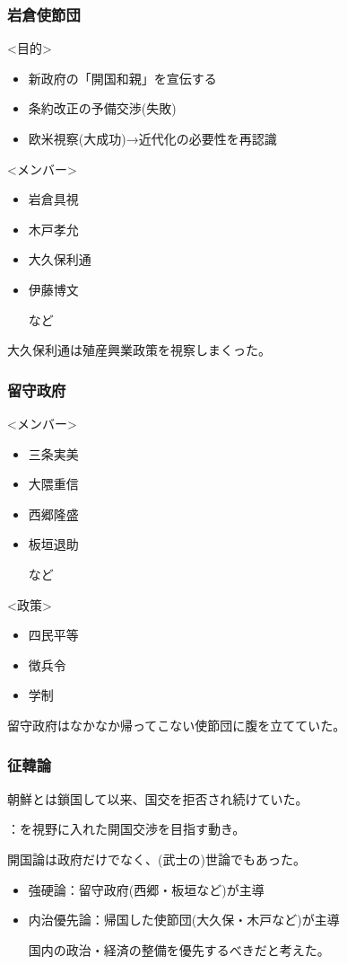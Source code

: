 \documentclass[12pt]{ltjsarticle}
\begin{document}
\subsubsection{岩倉使節団}
<目的>
\begin{itemize}
\item 新政府の「開国和親」を宣伝する
\item 条約改正の予備交渉(失敗)
\item 欧米視察(大成功)→近代化の必要性を再認識
\end{itemize}
<メンバー>
\begin{itemize}
\item 岩倉具視
\item 木戸孝允
\item 大久保利通
\item 伊藤博文

など
\end{itemize}
大久保利通は殖産興業政策を視察しまくった。

\subsubsection{留守政府}
<メンバー>
\begin{itemize}
\item 三条実美
\item 大隈重信
\item 西郷隆盛
\item 板垣退助

など
\end{itemize}
<政策>
\begin{itemize}
\item 四民平等
\item 徴兵令
\item 学制
\end{itemize}
留守政府はなかなか帰ってこない使節団に腹を立てていた。

\subsubsection{征韓論}
朝鮮とは鎖国して以来、国交を拒否され続けていた。

：を視野に入れた開国交渉を目指す動き。

開国論は政府だけでなく、(武士の)世論でもあった。

\begin{itemize}
\item 強硬論：留守政府(西郷・板垣など)が主導
\item 内治優先論：帰国した使節団(大久保・木戸など)が主導

国内の政治・経済の整備を優先するべきだと考えた。
\end{itemize}
\end{document}
